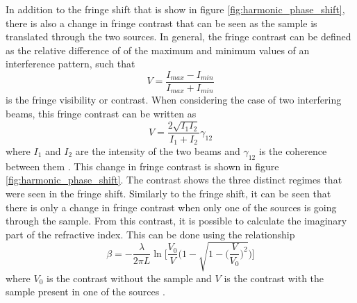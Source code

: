 In addition to the fringe shift that is show in figure \ref{fig:harmonic_phase_shift}, there is also a change in fringe contrast that can be seen as the sample is translated through the two sources.  In general, the fringe contrast can be defined as the relative difference of of the maximum and minimum values of an interference pattern, such that
\begin{equation}
	V=\frac{I_{max} - I_{min}}{I_{max} + I_{min}}
\end{equation}
is the fringe visibility or contrast.  When considering the case of two interfering beams, this fringe contrast can be written as
\begin{equation}
\label{eqn:fringe_visibility} 
	V = \frac{2\sqrt{I_1 I_2}}{I_1 + I_2}\gamma_{12}
\end{equation}
where $I_1$ and $I_2$ are the intensity of the two beams and $\gamma_{12}$ is the coherence between them \cite{hemmersMulticolorXUVInterferometry2009, ditmireSpatialCoherenceMeasurement1996, wilsonDoubleSlitInterferometry2012}. 
This change in fringe contrast is shown in figure \ref{fig:harmonic_phase_shift}.  The contrast shows the three distinct regimes that were seen in the fringe shift.  Similarly to the fringe shift, it can be seen that there is only a change in fringe contrast when only one of the sources is going through the sample.  From this contrast, it is possible to calculate the imaginary part of the refractive index.  This can be done using the relationship
\begin{equation}
\label{eqn:beta_fringe_contrast}
	\beta = -\frac{\lambda}{2\pi L}\ln\Bigg[\frac{V_0}{V}\Bigg(1-\sqrt{1-\bigg(\frac{V}{V_0}\bigg)^2}\Bigg)\Bigg]
\end{equation} 
where $V_0$ is the contrast without the sample and $V$ is the contrast with the sample present in one of the sources \cite{hemmersMulticolorXUVInterferometry2009}.

